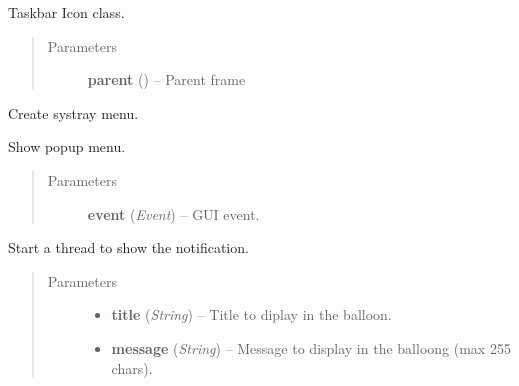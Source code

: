 \documentclass[letterpaper,10pt,english]{sphinxmanual}
\begin{document}
\begin{fulllineitems}
\label{graphicaldesign:graphicaldesign.SysTray}
Taskbar Icon class.
\begin{quote}\begin{description}
\item[{Parameters}] \leavevmode
\textbf{parent} () -- Parent frame

\end{description}\end{quote}

\begin{fulllineitems}
\label{graphicaldesign:graphicaldesign.SysTray.CreateMenu}
Create systray menu.

\end{fulllineitems}


\begin{fulllineitems}
\label{graphicaldesign:graphicaldesign.SysTray.ShowMenu}
Show popup menu.
\begin{quote}\begin{description}
\item[{Parameters}] \leavevmode
\textbf{event} (\emph{Event}) -- GUI event.

\end{description}\end{quote}

\end{fulllineitems}


\begin{fulllineitems}
\label{graphicaldesign:graphicaldesign.SysTray.ShowNotification}
Start a thread to show the notification.
\begin{quote}\begin{description}
\item[{Parameters}] \leavevmode\begin{itemize}
\item {} 
\textbf{title} (\emph{String}) -- Title to diplay in the balloon.

\item {} 
\textbf{message} (\emph{String}) -- Message to display in the balloong (max 255 chars).

\end{itemize}

\end{description}\end{quote}

\end{fulllineitems}


\end{fulllineitems}
\end{document}
